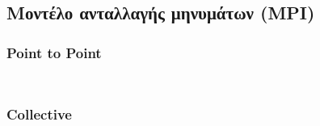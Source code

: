 \documentclass[a4paper,10pt]{article} \usepackage{anysize}
\begin{document}
\subsection{Μοντέλο ανταλλαγής μηνυμάτων (\textbf{MPI})}

\subsubsection{Point to Point}

\inputminted[linenos,fontsize=\footnotesize,frame=leftline]{c}{files/src-mpi-ptp-hybrid-main.c}
\inputminted[linenos,fontsize=\footnotesize,frame=leftline]{c}{files/src-mpi-ptp-continuous-single-main.c}

\subsubsection{Collective}
\inputminted[linenos,fontsize=\footnotesize,frame=leftline]{c}{files/src-mpi-collective-hybrid-main.c}
\inputminted[linenos,fontsize=\footnotesize,frame=leftline]{c}{files/src-mpi-collective-continuous-single-main.c}
\end{document}
